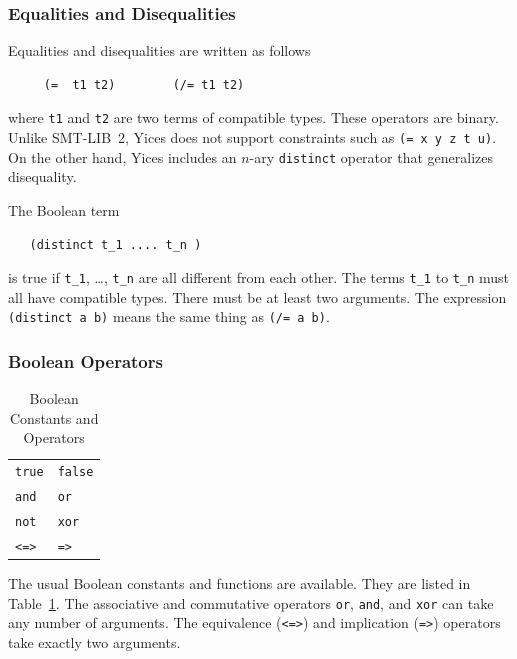 \documentclass[11pt,twoside,fleqn,openright,titlepage]{cslreport}
\begin{document}
\subsubsection*{Equalities and Disequalities}

Equalities and disequalities are written as follows
\begin{small}
\begin{verbatim}
     (=  t1 t2)        (/= t1 t2)
\end{verbatim}
\end{small}
where \texttt{t1} and \texttt{t2} are two terms of compatible
types. These operators are binary. Unlike SMT-LIB~2, Yices does not
support constraints such as \texttt{(= x y z t u)}. On the other hand,
Yices includes an $n$-ary \texttt{distinct} operator that generalizes
disequality.

\pagebreak
\medskip\noindent
The Boolean term
\begin{small}
\begin{verbatim}
   (distinct t_1 .... t_n )
\end{verbatim}
\end{small}
is true if \texttt{t\_1}, \ldots, \texttt{t\_n} are all different
from each other. The terms \texttt{t\_1} to \texttt{t\_n} must all
have compatible types.  There must be at least two arguments. The
expression \texttt{(distinct a b)} means the same thing as \texttt{(/= a
  b)}.

\subsubsection*{Boolean Operators}

\begin{table}[h]
\begin{small}
\begin{center}
\begin{tabular}{|p{2cm}|p{2cm}|}
\hline
\texttt{true} & \texttt{false} \\
\texttt{and} & \texttt{or}  \\
\texttt{not} & \texttt{xor}  \\
\texttt{<=>} & \texttt{=>}  \\
\hline
\end{tabular}
\end{center}
\end{small}
\caption{Boolean Constants and Operators}
\label{Boolean-Operators}
\end{table}

\noindent
The usual Boolean constants and functions are available. They are
listed in Table~\ref{Boolean-Operators}.  The associative and
commutative operators \texttt{or}, \texttt{and}, and \texttt{xor} can
take any number of arguments. The equivalence (\texttt{<=>}) and
implication (\texttt{=>}) operators take exactly two arguments.
\end{document}
